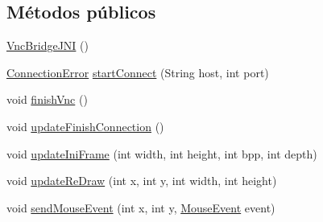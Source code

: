 \subsection*{Métodos públicos}
\begin{DoxyCompactItemize}
\item 
\hyperlink{classes_1_1ucm_1_1tfg_1_1controlremotolinux_1_1client_1_1model_1_1VncBridgeJNI_ad7fef2e4d894b3204327c72f07ecf938}{Vnc\-Bridge\-J\-N\-I} ()
\item 
\hyperlink{enumes_1_1ucm_1_1tfg_1_1controlremotolinux_1_1client_1_1model_1_1VncBridgeJNI_1_1ConnectionError}{Connection\-Error} \hyperlink{classes_1_1ucm_1_1tfg_1_1controlremotolinux_1_1client_1_1model_1_1VncBridgeJNI_a0ae954e57823b9801b127b181e728569}{start\-Connect} (String host, int port)
\item 
void \hyperlink{classes_1_1ucm_1_1tfg_1_1controlremotolinux_1_1client_1_1model_1_1VncBridgeJNI_af47a6c1a5477402703578483b143f91c}{finish\-Vnc} ()
\item 
void \hyperlink{classes_1_1ucm_1_1tfg_1_1controlremotolinux_1_1client_1_1model_1_1VncBridgeJNI_ab6f85e7edd28f8701de77c9728268e6e}{update\-Finish\-Connection} ()
\item 
void \hyperlink{classes_1_1ucm_1_1tfg_1_1controlremotolinux_1_1client_1_1model_1_1VncBridgeJNI_a5432fcab493b414d14f3ad51af64ef84}{update\-Ini\-Frame} (int width, int height, int bpp, int depth)
\item 
void \hyperlink{classes_1_1ucm_1_1tfg_1_1controlremotolinux_1_1client_1_1model_1_1VncBridgeJNI_a2f4c91a7fc28a25ac4742e491fd6e6a2}{update\-Re\-Draw} (int x, int y, int width, int height)
\item 
void \hyperlink{classes_1_1ucm_1_1tfg_1_1controlremotolinux_1_1client_1_1model_1_1VncBridgeJNI_a4f8dafeebd227101df0a17b280d215ec}{send\-Mouse\-Event} (int x, int y, \hyperlink{enumes_1_1ucm_1_1tfg_1_1controlremotolinux_1_1client_1_1model_1_1VncBridgeJNI_1_1MouseEvent}{Mouse\-Event} event)
\end{DoxyCompactItemize}

